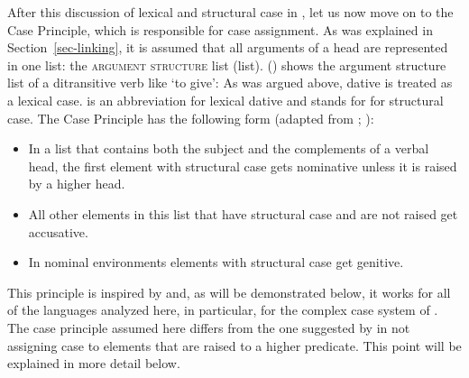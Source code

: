








After this discussion of lexical and structural case in , let us now move on to the Case Principle,
which is responsible for case assignment. As was explained in Section~\ref{sec-linking}, it is assumed that all arguments of a
head are represented in one list: the \textsc{argument structure} list (\argst list). 
() shows the argument structure list of a ditransitive verb like  `to give':
\ea
{}
\z
As was argued above, dative is treated as a lexical case.  is an abbreviation for lexical
dative and  stands for for structural case. The Case
Principle has the following form (adapted from \citealp{Prze99}; \citealp{Meurers99b}):

\begin{principle-break}
\label{case-p}
\begin{itemize}
\item In a list that contains both the subject and the complements of a verbal head, the first
  element with structural case gets nominative unless it is raised by a higher head.
\item All other elements in this list that have structural case and are not raised get accusative.
\item In nominal environments elements with structural case get genitive.
\end{itemize}
\end{principle-break}
This principle is inspired by \citet*{YMJ87} and, as will be demonstrated below, it works for all of
the languages analyzed here, in particular, for the complex case system of . The case
principle assumed here differs from the one suggested by \citeauthor*{YMJ87} in not assigning case to elements that are raised
to a higher predicate. This point will be explained in more detail below.

